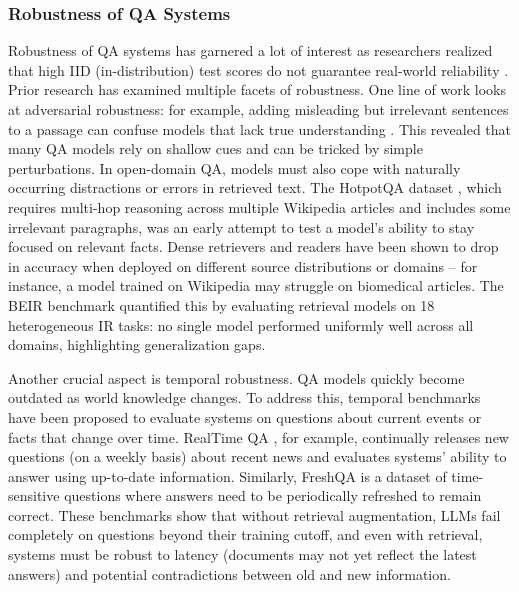 \subsubsection{Robustness of QA Systems}

Robustness of QA systems has garnered a lot of interest as researchers realized that high IID (in-distribution) test scores do not guarantee real-world reliability \cite{thakurBEIRHeterogenousBenchmark2021}. Prior research has examined multiple facets of robustness. One line of work looks at adversarial robustness: for example, adding misleading but irrelevant sentences to a passage can confuse models that lack true understanding \cite{jiaAdversarialExamplesEvaluating2017}. This revealed that many QA models rely on shallow cues and can be tricked by simple perturbations. In open-domain QA, models must also cope with naturally occurring distractions or errors in retrieved text. The HotpotQA dataset \cite{yangHotpotQADatasetDiverse2018a}, which requires multi-hop reasoning across multiple Wikipedia articles and includes some irrelevant paragraphs, was an early attempt to test a model's ability to stay focused on relevant facts. Dense retrievers and readers have been shown to drop in accuracy when deployed on different source distributions or domains – for instance, a model trained on Wikipedia may struggle on biomedical articles. The BEIR benchmark \cite{thakurBEIRHeterogenousBenchmark2021} quantified this by evaluating retrieval models on 18 heterogeneous IR tasks: no single model performed uniformly well across all domains, highlighting generalization gaps.

Another crucial aspect is temporal robustness. QA models quickly become outdated as world knowledge changes. To address this, temporal benchmarks have been proposed to evaluate systems on questions about current events or facts that change over time. RealTime QA \cite{kasaiRealTimeQAWhats2024}, for example, continually releases new questions (on a weekly basis) about recent news and evaluates systems' ability to answer using up-to-date information. Similarly, FreshQA \cite{vuFreshLLMsRefreshingLarge2023} is a dataset of time-sensitive questions where answers need to be periodically refreshed to remain correct. These benchmarks show that without retrieval augmentation, LLMs fail completely on questions beyond their training cutoff, and even with retrieval, systems must be robust to latency (documents may not yet reflect the latest answers) and potential contradictions between old and new information.

